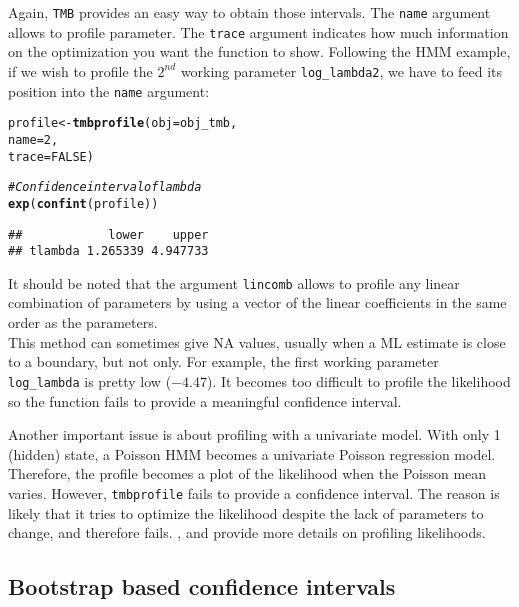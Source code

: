 \documentclass[bimj,fleqn]{w-art}\usepackage[]{graphicx}\usepackage[]{color}
\makeatletter
\newcommand{\hlnum}[1]{\textcolor[rgb]{0.686,0.059,0.569}{#1}}%
\newcommand{\hlcom}[1]{\textcolor[rgb]{0.678,0.584,0.686}{\textit{#1}}}%
\newcommand{\hlstd}[1]{\textcolor[rgb]{0.345,0.345,0.345}{#1}}%
\newcommand{\hlkwb}[1]{\textcolor[rgb]{0.69,0.353,0.396}{#1}}%
\newcommand{\hlkwc}[1]{\textcolor[rgb]{0.333,0.667,0.333}{#1}}%
\newcommand{\hlkwd}[1]{\textcolor[rgb]{0.737,0.353,0.396}{\textbf{#1}}}%
\newenvironment{kframe}{%
 \def\at@end@of@kframe{}%
 \ifinner\ifhmode%
  \def\at@end@of@kframe{\end{minipage}}%
  \begin{minipage}{\columnwidth}%
 \fi\fi%
 \def\FrameCommand##1{\hskip\@totalleftmargin \hskip-\fboxsep
 \colorbox{shadecolor}{##1}\hskip-\fboxsep
     \hskip-\linewidth \hskip-\@totalleftmargin \hskip\columnwidth}%
 \MakeFramed {\advance\hsize-\width
   \@totalleftmargin\z@ \linewidth\hsize
   \@setminipage}}%
 {\par\unskip\endMakeFramed%
 \at@end@of@kframe}
\newenvironment{knitrout}{}{} %
\theoremstyle{plain}
\theoremstyle{definition}
\makeatother
\begin{document}
Again, {\tt{TMB}} provides an easy way to obtain those intervals.
The \texttt{name} argument allows to profile parameter.
The \texttt{trace} argument indicates how much information on the optimization you want the function to show.
Following the HMM example, if we wish to profile the $2^{nd}$ working parameter \texttt{log\_lambda2}, we have to feed its position into the \texttt{name} argument:
\begin{knitrout}
\color{fgcolor}\begin{kframe}
\begin{alltt}
\hlstd{profile} \hlkwb{<-} \hlkwd{tmbprofile}\hlstd{(}\hlkwc{obj} \hlstd{= obj_tmb,}
                      \hlkwc{name} \hlstd{=} \hlnum{2}\hlstd{,}
                      \hlkwc{trace} \hlstd{=} \hlnum{FALSE}\hlstd{)}

\hlcom{# Confidence interval of lambda}
\hlkwd{exp}\hlstd{(}\hlkwd{confint}\hlstd{(profile))}
\end{alltt}
\begin{verbatim}
##            lower    upper
## tlambda 1.265339 4.947733
\end{verbatim}
\end{kframe}
\end{knitrout}
It should be noted that the argument \texttt{lincomb} allows to profile any linear combination of parameters by using a vector of the linear coefficients in the same order as the parameters.\\
This method can sometimes give NA values, usually when a ML estimate is close to a boundary, but not only.
For example, the first working parameter \texttt{log\_lambda} is pretty low ($-4.47$).
It becomes too difficult to profile the likelihood so the function fails to provide a meaningful confidence interval.

Another important issue is about profiling with a univariate model.
With only 1 (hidden) state, a Poisson HMM becomes a univariate Poisson regression model.
Therefore, the profile becomes a plot of the likelihood when the Poisson mean varies.
However, \texttt{tmbprofile} fails to provide a confidence interval.
The reason is likely that it tries to optimize the likelihood despite the lack of parameters to change, and therefore fails.
\citet{visser}, \citet{meeker} and \citet{venzon} provide more details on profiling likelihoods.

\subsection{Bootstrap based confidence intervals}
\label{sec:bootstrapping}
\end{document}

